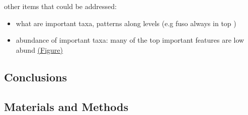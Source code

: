 \documentclass[
]{article}
\providecommand{\tightlist}{%
  \setlength{\itemsep}{0pt}\setlength{\parskip}{0pt}}
\begin{document}
other items that could be addressed:

\begin{itemize}
\tightlist
\item
  what are important taxa, patterns along levels (e.g fuso always in top
  )
\item
  abundance of important taxa: many of the top important features are
  low abund
  \protect\hyperlink{relative-abundance-of-important-features}{(Figure)}
\end{itemize}

\hypertarget{conclusions}{%
\subsection{Conclusions}\label{conclusions}}

\hypertarget{materials-and-methods}{%
\subsection{Materials and Methods}\label{materials-and-methods}}
\end{document}
